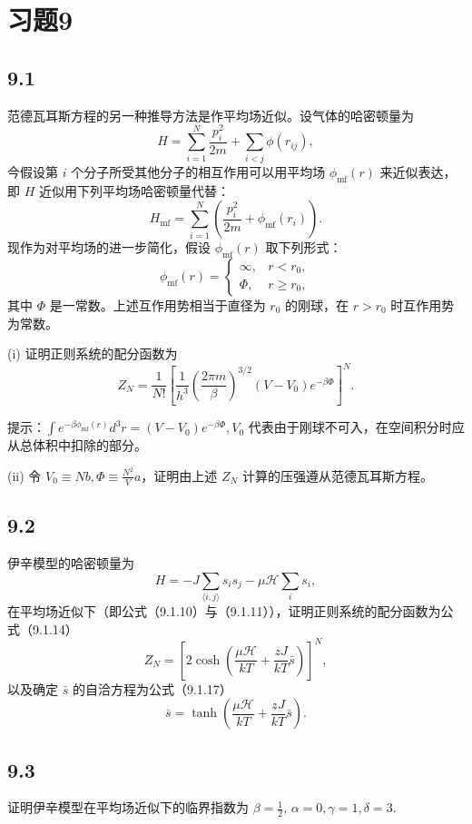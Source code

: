 \section{习题9}

\newpage
\subsection{9.1}
范德瓦耳斯方程的另一种推导方法是作平均场近似。设气体的哈密顿量为
$$H = \sum_{i=1}^{N} \frac{p_i^2}{2m} + \sum_{i<j} \phi(r_{ij}),$$
今假设第 $i$ 个分子所受其他分子的相互作用可以用平均场 $\phi_{\text{mf}}(r)$ 来近似表达，即 $H$ 近似用下列平均场哈密顿量代替：
$$H_{\text{mf}} = \sum_{i=1}^{N} \left( \frac{p_i^2}{2m} + \phi_{\text{mf}}(r_i) \right).$$
现作为对平均场的进一步简化，假设 $\phi_{\text{mf}}(r)$ 取下列形式：
$$\phi_{\text{mf}}(r) = 
\begin{cases} 
\infty, & r < r_0, \\
\Phi, & r \geq r_0,
\end{cases}$$
其中 $\Phi$ 是一常数。上述互作用势相当于直径为 $r_0$ 的刚球，在 $r > r_0$ 时互作用势为常数。

(i) 证明正则系统的配分函数为
$$Z_N = \frac{1}{N!} \left[ \frac{1}{h^3} \left( \frac{2\pi m}{\beta} \right)^{3/2} (V - V_0) e^{-\beta \Phi} \right]^N.$$

提示：$\int e^{-\beta \phi_{\text{mf}}(r)} d^3 r = (V - V_0) e^{-\beta \Phi}, V_0$ 代表由于刚球不可入，在空间积分时应从总体积中扣除的部分。

(ii) 令 $V_0 \equiv Nb, \Phi \equiv \frac{N^2}{V} a$，证明由上述 $Z_N$ 计算的压强遵从范德瓦耳斯方程。

\newpage
\subsection{9.2}
伊辛模型的哈密顿量为
$$H = -J \sum_{\langle i,j \rangle} s_i s_j - \mu \mathcal{H} \sum_i s_i,$$
在平均场近似下（即公式（9.1.10）与（9.1.11）），证明正则系统的配分函数为公式（9.1.14）
$$Z_N = \left[ 2 \cosh \left( \frac{\mu \mathcal{H}}{kT} + \frac{zJ}{kT} \bar{s} \right) \right]^N,$$
以及确定 $\bar{s}$ 的自洽方程为公式（9.1.17）
$$\bar{s} = \tanh \left( \frac{\mu \mathcal{H}}{kT} + \frac{zJ}{kT} \bar{s} \right).$$

\newpage
\subsection{9.3}
证明伊辛模型在平均场近似下的临界指数为 $\beta = \frac{1}{2}$, $\alpha = 0, \gamma = 1, \delta = 3$.

